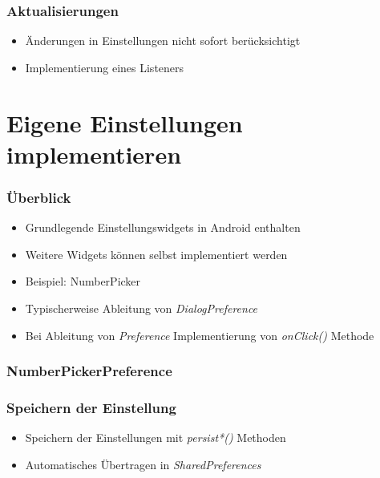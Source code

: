 \begin{frame}
   \frametitle{Aktualisierungen}
   \begin{itemize}
      \item Änderungen in Einstellungen nicht sofort berücksichtigt
      \item Implementierung eines Listeners
   \end{itemize}

   
\end{frame}
   
\section{Eigene Einstellungen implementieren}
\begin{frame}
   \frametitle{Überblick}
   \begin{itemize}
      \item Grundlegende Einstellungswidgets in Android enthalten
      \item Weitere Widgets können selbst implementiert werden
      \item Beispiel: NumberPicker
      \item Typischerweise Ableitung von \emph{DialogPreference}
      \item Bei Ableitung von \emph{Preference} Implementierung von \emph{onClick()} 
      	Methode
   \end{itemize}
\end{frame}

\begin{frame}
   \frametitle{NumberPickerPreference}
   
\end{frame}

\begin{frame}
   \frametitle{Speichern der Einstellung}
   \begin{itemize}
      \item Speichern der Einstellungen mit \emph{persist*()} Methoden  
      \item Automatisches Übertragen in \emph{SharedPreferences}
   \end{itemize}

   
\end{frame}


